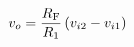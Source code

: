\begin{equation}
	\vout = \frac{\R[F]}{\R[1]}\left(\vin[2] - \vin[1]\right)
	\label{eq:difference_amp}
\end{equation}



